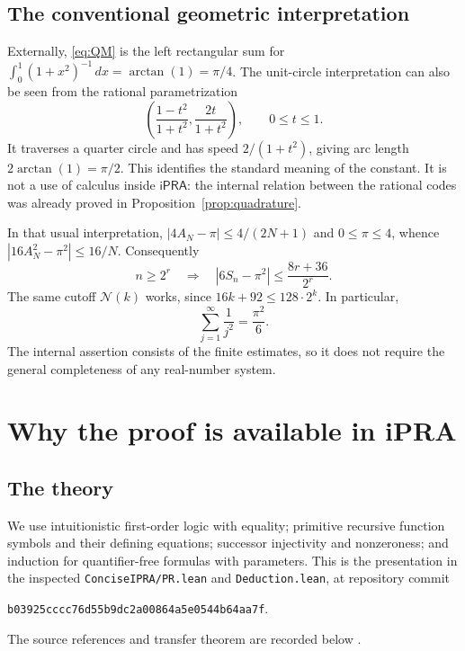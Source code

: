 \documentclass[11pt,a4paper]{article}
\theoremstyle{remark}\newtheorem{remark}[theorem]{Remark}
\newcommand{\ipra}{\mathsf{iPRA}}
\newcommand{\abs}[1]{\left|#1\right|}
\newcommand{\cut}{\mathcal N}
\begin{document}
\subsection{The conventional geometric interpretation}

Externally, \eqref{eq:QM} is the left rectangular sum for
$\int_0^1(1+x^2)^{-1}\,dx=\arctan(1)=\pi/4$.
The unit-circle interpretation can also be seen from the rational
parametrization
\[
 \left(\frac{1-t^2}{1+t^2},\frac{2t}{1+t^2}\right),
 \qquad 0\le t\le1.
\]
It traverses a quarter circle and has speed $2/(1+t^2)$, giving
arc length $2\arctan(1)=\pi/2$. This identifies the standard meaning
of the constant. It is not a use of calculus inside $\ipra$:
the internal relation between the rational codes was already proved
in Proposition~\ref{prop:quadrature}.

In that usual interpretation,
$\abs{4A_N-\pi}\le4/(2N+1)$ and $0\le\pi\le4$, whence
$\abs{16A_N^2-\pi^2}\le16/N$. Consequently
\begin{equation}\label{eq:realmodulus}
 n\ge2^r\quad\Longrightarrow\quad
 \abs{6S_n-\pi^2}\le\frac{8r+36}{2^r}.
\end{equation}
The same cutoff $\cut(k)$ works, since
$16k+92\le128\cdot2^k$. In particular,
\[
 \boxed{\displaystyle \sum_{j=1}^{\infty}\frac1{j^2}=\frac{\pi^2}{6}.}
\]
The internal assertion consists of the finite estimates, so it does
not require the general completeness of any real-number system.

\section{Why the proof is available in iPRA}\label{sec:encoding}

\subsection{The theory}

We use intuitionistic first-order logic with equality; primitive
recursive function symbols and their defining equations; successor
injectivity and nonzeroness; and induction for quantifier-free
formulas with parameters.
This is the presentation in the inspected
\texttt{ConciseIPRA/PR.lean} and \texttt{Deduction.lean}, at
repository commit
\begin{center}\small
\texttt{b03925cccc76d55b9dc2a00864a5e0544b64aa7f}.
\end{center}
The source references and transfer theorem are recorded below
\cite{ProveItPR,ProveItNative}.
\end{document}
